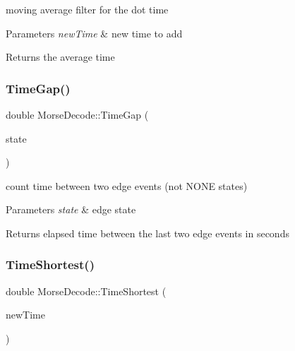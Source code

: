 moving average filter for the dot time 


\begin{DoxyParams}{Parameters}
{\em new\+Time} & new time to add \\
\hline
\end{DoxyParams}
\begin{DoxyReturn}{Returns}
the average time 
\end{DoxyReturn}
\mbox{\label{classMorseDecode_a90f76d35c56413f35f59fa88e4c0a95c}} 
\subsubsection{\texorpdfstring{Time\+Gap()}{TimeGap()}}
{\footnotesize\ttfamily double Morse\+Decode\+::\+Time\+Gap (\begin{DoxyParamCaption}\item[{Morse\+::\+Edge\+State}]{state }\end{DoxyParamCaption})\hspace{0.3cm}{\ttfamily [private]}}



count time between two edge events (not N\+O\+NE states) 


\begin{DoxyParams}{Parameters}
{\em state} & edge state \\
\hline
\end{DoxyParams}
\begin{DoxyReturn}{Returns}
elapsed time between the last two edge events in seconds 
\end{DoxyReturn}
\mbox{\label{classMorseDecode_afd5655c1ea13e9ea09bdc25ef9d0bece}} 
\subsubsection{\texorpdfstring{Time\+Shortest()}{TimeShortest()}}
{\footnotesize\ttfamily double Morse\+Decode\+::\+Time\+Shortest (\begin{DoxyParamCaption}\item[{double}]{new\+Time }\end{DoxyParamCaption})\hspace{0.3cm}{\ttfamily [private]}}




